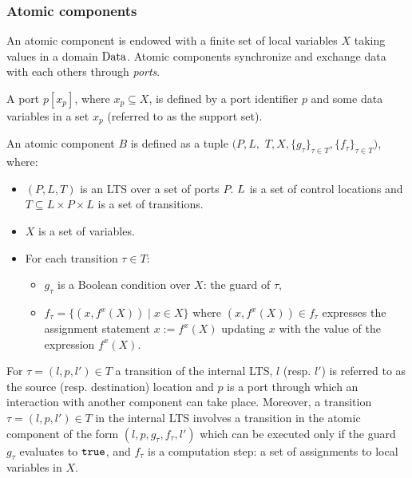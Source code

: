 \subsubsection{Atomic components}
%
An atomic component is endowed with a finite set of local variables $X$ taking values in a domain $\mathit{\Data}$. Atomic components synchronize and exchange data with each others through \emph{ports}.
%
\begin{definition}[Port]
A port $p[x_p]$, where $x_p\subseteq X$, is defined by a port identifier $p$ and some data variables in a set $x_p$ (referred to as the support set). %
\end{definition}
%
%
\begin{definition}
An atomic component $B$ is defined as a tuple $(P,L,$ $T,X,\{g_\tau\}_{\tau \in T}, \{f_{ \tau}\}_{\tau \in T})$, 
where:
\begin{itemize}
\item $(P,L,T)$ is an LTS over a set of ports $P$. $L\ignore{=\{l_1,l_2,\ldots,l_k\}}$ is a set of control locations and $T \subseteq L \times P \times L$ is a set of transitions.
\item $X$ is a set of variables.
\item For each transition $\tau \in T$: 
\begin{itemize}
\item $g_{\tau}$ is a Boolean condition over $X$: the guard of $\tau$,
\item $f_\tau = \{ (x, f^x(X)) \mid x\in X\}$ where $(x,f^x(X)) \in f_\tau$ expresses the assignment statement $x := f^x(X)$ updating $x$ with the value of the expression $f^x(X)$. 
\end{itemize}
\end{itemize}
\end{definition}
%
For $\tau = (l,p,l')\in T$ a transition of the internal LTS, $l$ (resp. $l'$) is referred to as the source (resp.
destination) location and $p$ is a port through which an interaction with another component can take place. Moreover, a transition $\tau = (l,p,l')\in T$ in the internal LTS involves a transition in the atomic component of the form $(l,p,g_\tau,f_\tau,l')$ which can be executed only if the guard $g_\tau$ evaluates to $\true$, and $f_\tau$ is a computation step: a set of assignments to local variables in $X$.

